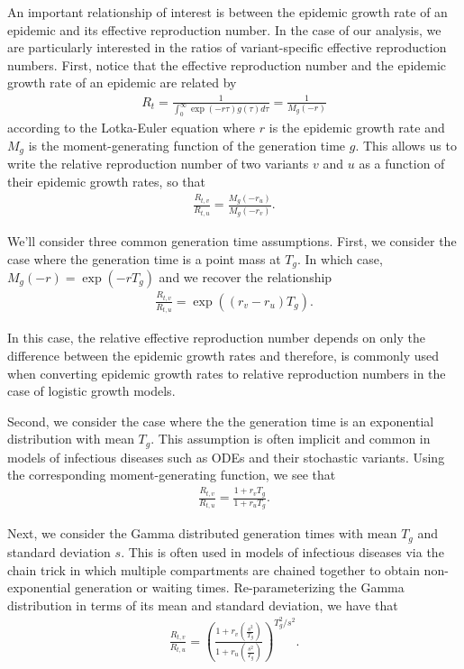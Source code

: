 \documentclass[11pt,oneside,letterpaper]{article}
\begin{document}
An important relationship of interest is between the epidemic growth rate of an epidemic and its effective reproduction number.
In the case of our analysis, we are particularly interested in the ratios of variant-specific effective reproduction numbers.
First, notice that the effective reproduction number and the epidemic growth rate of an epidemic are related by
\begin{align*}
R_{t} = \frac{1}{\int_{0}^{\infty} \exp(-r\tau)g(\tau)d\tau} = \frac{1}{M_{g}(-r)}
\end{align*}
according to the Lotka-Euler equation \cite{Wallinga2006} where $r$ is the epidemic growth rate and $M_{g}$ is the moment-generating function of the generation time $g$.
This allows us to write the relative reproduction number of two variants $v$ and $u$ as a function of their epidemic growth rates, so that
\begin{align*}
\frac{R_{t,v}}{R_{t,u}} = \frac{M_{g}(-r_{u})}{M_{g}(-r_{v})}.
\end{align*}

We'll consider three common generation time assumptions. First, we consider the case where the generation time is a point mass at $T_{g}$. In which case, $M_{g}(-r) = \exp(-r T_{g})$ and we recover the relationship
\begin{align*}
\frac{R_{t,v}}{R_{t,u}} = \exp( (r_{v}-r_{u})T_{g}).
\end{align*}

In this case, the relative effective reproduction number depends on only the difference between the epidemic growth rates and therefore, is commonly used when converting epidemic growth rates to relative reproduction numbers in the case of logistic growth models.

Second, we consider the case where the the generation time is an exponential distribution with mean $T_{g}$. This assumption is often implicit and common in models of infectious diseases such as ODEs and their stochastic variants. Using the corresponding moment-generating function, we see that
\begin{align*}
\frac{R_{t,v}}{R_{t,u}} = \frac{1 + r_{v} T_{g}}{1 + r_{u} T_{g}}.
\end{align*}


Next, we consider the Gamma distributed generation times with mean $T_{g}$ and standard deviation $s$.
This is often used in models of infectious diseases via the chain trick in which multiple compartments are chained together to obtain non-exponential generation or waiting times.
Re-parameterizing the Gamma distribution in terms of its mean and standard deviation, we have that
\begin{align*}
\frac{R_{t,v}}{R_{t,u}} = \left( \frac{1 + r_{v}  \left(\frac{s^{2}}{T_{g}}\right)}{1 + r_{u} \left(\frac{s^{2}}{T_{g}}\right) } \right)^{T_{g}^{2} / s^{2}}.
\end{align*}
\end{document}
